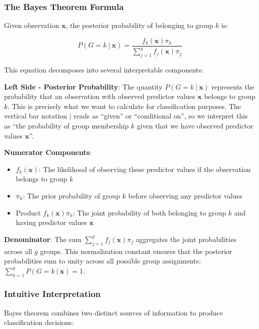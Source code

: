 \documentclass[
]{article}
\begin{document}
\subsubsection{The Bayes Theorem Formula}

Given observation \(\mathbf{x}\), the posterior probability of belonging
to group \(k\) is:

\[P\left( G = k~|~\mathbf{x} \right) = \frac{f_{k}\left( \mathbf{x} \right)\pi_{k}}{\sum_{j = 1}^{g}f_{j}\left( \mathbf{x} \right)\pi_{j}}\]

This equation decomposes into several interpretable components:

\textbf{Left Side - Posterior Probability}: The quantity
\(P\left( G = k~|~\mathbf{x} \right)\) represents the probability that
an observation with observed predictor values \(\mathbf{x}\) belongs to
group \(k\). This is precisely what we want to calculate for
classification purposes. The vertical bar notation \(|\) reads as
``given'' or ``conditional on'', so we interpret this as ``the
probability of group membership \(k\) given that we have observed
predictor values \(\mathbf{x}\)''.

\textbf{Numerator Components}:

\begin{itemize}
\item
  \(f_{k}\left( \mathbf{x} \right)\): The likelihood of observing these
  predictor values if the observation belongs to group \(k\)
\item
  \(\pi_{k}\): The prior probability of group \(k\) before observing any
  predictor values
\item
  Product \(f_{k}\left( \mathbf{x} \right)\pi_{k}\): The joint
  probability of both belonging to group \(k\) and having predictor
  values \(\mathbf{x}\)
\end{itemize}

\textbf{Denominator}: The sum
\(\sum_{j = 1}^{g}f_{j}\left( \mathbf{x} \right)\pi_{j}\) aggregates the
joint probabilities across all \(g\) groups. This normalization constant
ensures that the posterior probabilities sum to unity across all
possible group assignments:
\(\sum_{k = 1}^{g}P\left( G = k~|~\mathbf{x} \right) = 1\).

\subsubsection{Intuitive Interpretation}

Bayes theorem combines two distinct sources of information to produce
classification decisions:
\end{document}
